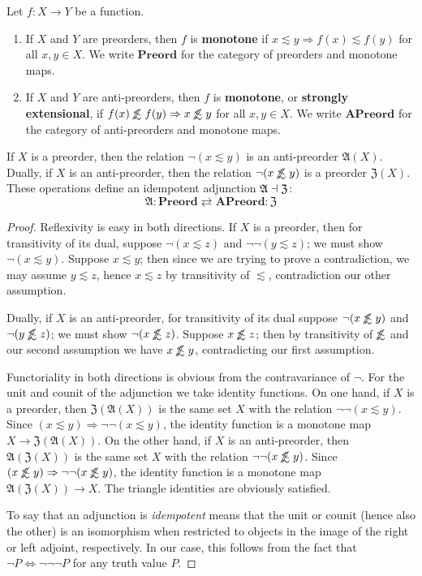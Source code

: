 \documentclass{article}
\def\oapt{\mathrel{\!\not\,\not\lesssim}}
\def\leapx{\lesssim}
\let\implies\Rightarrow
\def\anti{\mathfrak{A}}
\def\neigh{\mathfrak{Z}}
\def\Preord{\mathbf{Preord}}
\def\APreord{\mathbf{APreord}}
\begin{document}
\begin{defn}
  Let $f:X\to Y$ be a function.
  \begin{enumerate}
  \item If $X$ and $Y$ are preorders, then $f$ is \textbf{monotone} if $x\leapx y \implies f(x)\leapx f(y)$ for all $x,y\in X$.
    We write $\Preord$ for the category of preorders and monotone maps.
  \item If $X$ and $Y$ are anti-preorders, then $f$ is \textbf{monotone}, or \textbf{strongly extensional}, if $f(x)\oapt f(y) \implies x\oapt y$ for all $x,y\in X$.
    We write $\APreord$ for the category of anti-preorders and monotone maps.
  \end{enumerate}
\end{defn}

\begin{thm}\label{thm:ord-le-apt}
  If $X$ is a preorder, then the relation $\neg(x\leapx y)$ is an anti-preorder $\anti(X)$.
  Dually, if $X$ is an anti-preorder, then the relation $\neg(x\oapt y)$ is a preorder $\neigh(X)$.
  These operations define an idempotent adjunction $\anti\adj\neigh$:
  \[\anti : \Preord \rightleftarrows \APreord : \neigh\]
\end{thm}
\begin{proof}
  Reflexivity is easy in both directions.
  If $X$ is a preorder, then for transitivity of its dual, suppose $\neg(x\leapx z)$ and $\neg\neg(y\leapx z)$; we must show $\neg(x\leapx y)$.
  Suppose $x\leapx y$; then since we are trying to prove a contradiction, we may assume $y\leapx z$, hence $x\leapx z$ by transitivity of $\leapx$, contradiction our other assumption.

  Dually, if $X$ is an anti-preorder, for transitivity of its dual suppose $\neg (x\oapt y)$ and $\neg (y\oapt z)$; we must show $\neg(x\oapt z)$.
  Suppose $x\oapt z$; then by transitivity of $\oapt$ and our second assumption we have $x\oapt y$, contradicting our first assumption.

  Functoriality in both directions is obvious from the contravariance of $\neg$.
  For the unit and counit of the adjunction we take identity functions.
  On one hand, if $X$ is a preorder, then $\neigh(\anti(X))$ is the same set $X$ with the relation $\neg\neg(x\leapx y)$.
  Since $(x\leapx y) \implies \neg\neg(x\leapx y)$, the identity function is a monotone map $X\to \neigh(\anti(X))$.
  On the other hand, if $X$ is an anti-preorder, then $\anti(\neigh(X))$ is the same set $X$ with the relation $\neg\neg(x\oapt y)$.
  Since $(x\oapt y) \implies \neg\neg(x\oapt y)$, the identity function is a monotone map $\anti(\neigh(X)) \to X$.
  The triangle identities are obviously satisfied.

  To say that an adjunction is \emph{idempotent} means that the unit or counit (hence also the other) is an isomorphism when restricted to objects in the image of the right or left adjoint, respectively.
  In our case, this follows from the fact that $\neg P \iff \neg\neg\neg P$ for any truth value $P$.
\end{proof}
\end{document}
